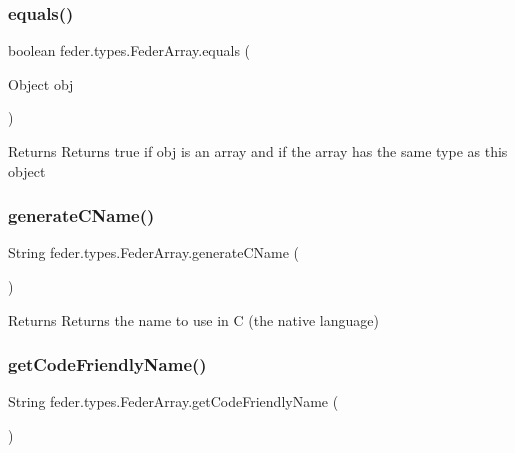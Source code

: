 \subsubsection{\texorpdfstring{equals()}{equals()}}
{\footnotesize\ttfamily boolean feder.\+types.\+Feder\+Array.\+equals (\begin{DoxyParamCaption}\item[{Object}]{obj }\end{DoxyParamCaption})}

\begin{DoxyReturn}{Returns}
Returns true if obj is an array and if the array has the same type as this object 
\end{DoxyReturn}
\mbox{\label{classfeder_1_1types_1_1FederArray_a3a90e3bd9b639374158bc5fd717c824b}} 
\subsubsection{\texorpdfstring{generate\+C\+Name()}{generateCName()}}
{\footnotesize\ttfamily String feder.\+types.\+Feder\+Array.\+generate\+C\+Name (\begin{DoxyParamCaption}{ }\end{DoxyParamCaption})}

\begin{DoxyReturn}{Returns}
Returns the name to use in C (the native language) 
\end{DoxyReturn}
\mbox{\label{classfeder_1_1types_1_1FederArray_a4928bd58e0ec5c07efdff1ebcef528ff}} 
\subsubsection{\texorpdfstring{get\+Code\+Friendly\+Name()}{getCodeFriendlyName()}}
{\footnotesize\ttfamily String feder.\+types.\+Feder\+Array.\+get\+Code\+Friendly\+Name (\begin{DoxyParamCaption}{ }\end{DoxyParamCaption})}

